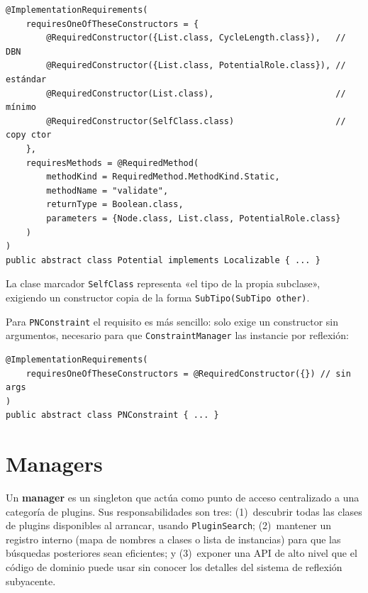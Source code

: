 \documentclass[12pt,a4paper,spanish]{article}
\begin{document}
\begin{lstlisting}[language=JavaPlugin,
    caption={@ImplementationRequirements en Potential}]
@ImplementationRequirements(
    requiresOneOfTheseConstructors = {
        @RequiredConstructor({List.class, CycleLength.class}),   // DBN
        @RequiredConstructor({List.class, PotentialRole.class}), // estándar
        @RequiredConstructor(List.class),                        // mínimo
        @RequiredConstructor(SelfClass.class)                    // copy ctor
    },
    requiresMethods = @RequiredMethod(
        methodKind = RequiredMethod.MethodKind.Static,
        methodName = "validate",
        returnType = Boolean.class,
        parameters = {Node.class, List.class, PotentialRole.class}
    )
)
public abstract class Potential implements Localizable { ... }
\end{lstlisting}

La clase marcador \texttt{SelfClass} representa «el tipo de la propia subclase»,
exigiendo un constructor copia de la forma \texttt{SubTipo(SubTipo other)}.

Para \texttt{PNConstraint} el requisito es más sencillo: solo exige un constructor
sin argumentos, necesario para que \texttt{ConstraintManager} las instancie por
reflexión:

\begin{lstlisting}[language=JavaPlugin,
    caption={@ImplementationRequirements en PNConstraint}]
@ImplementationRequirements(
    requiresOneOfTheseConstructors = @RequiredConstructor({}) // sin args
)
public abstract class PNConstraint { ... }
\end{lstlisting}

\section{Managers}
\label{sec:managers}

Un \textbf{manager} es un singleton que actúa como punto de acceso centralizado
a una categoría de plugins. Sus responsabilidades son tres: (1)~descubrir todas
las clases de plugins disponibles al arrancar, usando \texttt{PluginSearch};
(2)~mantener un registro interno (mapa de nombres a clases o lista de instancias)
para que las búsquedas posteriores sean eficientes; y (3)~exponer una API de alto
nivel que el código de dominio puede usar sin conocer los detalles del sistema de
reflexión subyacente.
\end{document}
